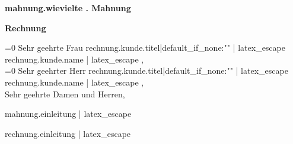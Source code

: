 \documentclass[a4paper,12pt,top=1.5cm,bottom=1.5cm]{article}
\begin{document}
    {%
        \large{\bf {{ mahnung.wievielte }}. Mahnung}\\[3ex]
    {%
        \large{\bf Rechnung}\\[3ex]
    {%

    \normalsize
    \ifnum{}=0
        Sehr geehrte Frau {{ rechnung.kunde.titel|default_if_none:"" | latex_escape }} {{ rechnung.kunde.name | latex_escape }},\\[2ex]
    \else
        \ifnum{}=0
            Sehr geehrter Herr {{ rechnung.kunde.titel|default_if_none:"" | latex_escape }} {{ rechnung.kunde.name | latex_escape }},\\[2ex]
        \else
            Sehr geehrte Damen und Herren,\\[2ex]
        \fi
    \fi

    {%
        {{ mahnung.einleitung | latex_escape }} \ \\[3ex]
    {%
        {{ rechnung.einleitung | latex_escape }} \ \\[3ex]
    {%

}}}}}}
\end{document}

